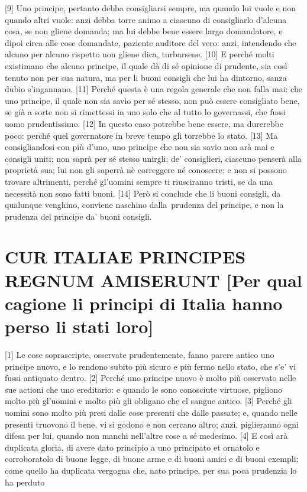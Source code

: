 {[}9{]} Uno principe, pertanto debba consigliarsi sempre, ma quando lui
vuole e non quando altri vuole: anzi debba torre animo a ciascuno di
consigliarlo d'alcuna cosa, se non gliene domanda; ma lui debbe bene
essere largo domandatore, e dipoi circa alle cose domandate, paziente
auditore del vero: anzi, intendendo che alcuno per alcuno rispetto non
gliene dica, turbarsene. {[}10{]} E perché molti existimano che alcuno
principe, il quale dà di sé opinione di prudente, sia così tenuto non
per sua natura, ma per li buoni consigli che lui ha dintorno, sanza
dubio s'ingannano. {[}11{]} Perché questa è una regola generale che non
falla mai: che uno principe, il quale non sia savio per sé stesso, non
può essere consigliato bene, se già a sorte non si rimettessi in uno
solo che al tutto lo governassi, che fussi uomo prudentissimo. {[}12{]}
In questo caso potrebbe bene essere, ma durerebbe poco: perché quel
governatore in breve tempo gli torrebbe lo stato. {[}13{]} Ma
consigliandosi con più d'uno, uno principe che non sia savio non arà mai
e consigli uniti; non saprà per sé stesso unirgli; de' consiglieri,
ciascuno penserà alla proprietà sua; lui non gli saperrà nè correggere
né conoscere: e non si possono trovare altrimenti, perché gl'uomini
sempre ti riusciranno tristi, se da una necessità non sono fatti buoni.
{[}14{]} Però si conclude che li buoni consigli, da qualunque venghino, conviene naschino dalla~prudenza del principe, e non la prudenza del principe da' buoni consigli.

\quebra\section{CUR ITALIAE PRINCIPES REGNUM AMISERUNT
{[}Per qual cagione li principi di Italia hanno perso li stati loro{]}}

{[}1{]} Le cose soprascripte, osservate prudentemente, fanno parere
antico uno principe nuovo, e lo rendono subito più sicuro e più fermo
nello stato, che s'e' vi fussi antiquato dentro. {[}2{]} Perché uno
principe nuovo è molto più osservato nelle sue actioni che uno
ereditario: e quando le sono conosciute virtuose, pigliono molto più
gl'uomini e molto più gli obligano che el sangue antico. {[}3{]} Perché
gli uomini sono molto più presi dalle cose presenti che dalle passate;
e, quando nelle presenti truovono il bene, vi si godono e non cercano
altro; anzi, piglieranno ogni difesa per lui, quando non manchi
nell'altre cose a sé medesimo. {[}4{]} E così arà duplicata gloria, di
avere dato principio a uno principato et ornatolo e corroboratolo di
buone legge, di buone arme e di buoni amici e di buoni exempli; come
quello ha duplicata vergogna che, nato principe, per sua poca prudenzia
lo ha perduto

